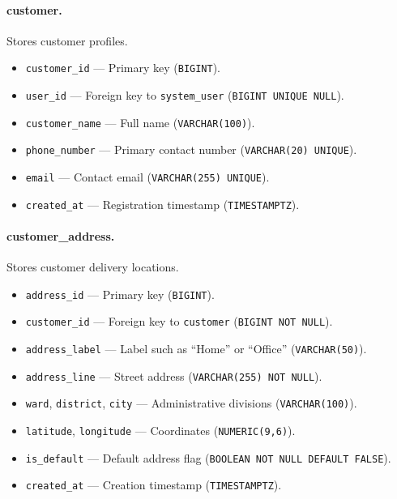 \paragraph{customer.}
Stores customer profiles.
\begin{itemize}
    \item \texttt{customer\_id} — Primary key (\texttt{BIGINT}).
    \item \texttt{user\_id} — Foreign key to \texttt{system\_user} (\texttt{BIGINT UNIQUE NULL}).
    \item \texttt{customer\_name} — Full name (\texttt{VARCHAR(100)}).
    \item \texttt{phone\_number} — Primary contact number (\texttt{VARCHAR(20) UNIQUE}).
    \item \texttt{email} — Contact email (\texttt{VARCHAR(255) UNIQUE}).
    \item \texttt{created\_at} — Registration timestamp (\texttt{TIMESTAMPTZ}).
\end{itemize}

\paragraph{customer\_address.}
Stores customer delivery locations.
\begin{itemize}
    \item \texttt{address\_id} — Primary key (\texttt{BIGINT}).
    \item \texttt{customer\_id} — Foreign key to \texttt{customer} (\texttt{BIGINT NOT NULL}).
    \item \texttt{address\_label} — Label such as ``Home'' or ``Office'' (\texttt{VARCHAR(50)}).
    \item \texttt{address\_line} — Street address (\texttt{VARCHAR(255) NOT NULL}).
    \item \texttt{ward}, \texttt{district}, \texttt{city} — Administrative divisions (\texttt{VARCHAR(100)}).
    \item \texttt{latitude}, \texttt{longitude} — Coordinates (\texttt{NUMERIC(9,6)}).
    \item \texttt{is\_default} — Default address flag (\texttt{BOOLEAN NOT NULL DEFAULT FALSE}).
    \item \texttt{created\_at} — Creation timestamp (\texttt{TIMESTAMPTZ}).
\end{itemize}

